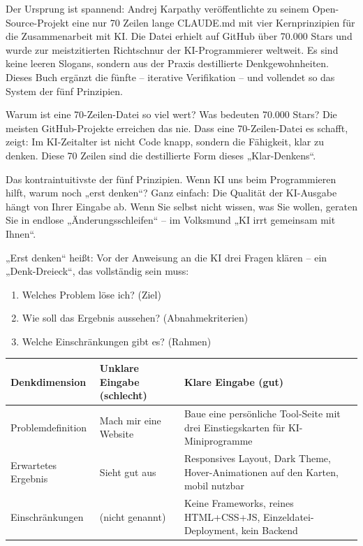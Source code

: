 

Der Ursprung ist spannend: Andrej Karpathy veröffentlichte zu seinem Open-Source-Projekt eine nur 70 Zeilen lange CLAUDE.md mit vier Kernprinzipien für die Zusammenarbeit mit KI. Die Datei erhielt auf GitHub über 70.000 Stars und wurde zur meistzitierten Richtschnur der KI-Programmierer weltweit. Es sind keine leeren Slogans, sondern aus der Praxis destillierte Denkgewohnheiten. Dieses Buch ergänzt die fünfte – iterative Verifikation – und vollendet so das System der fünf Prinzipien.

\begin{tcbinfo}{Warum ist eine 70-Zeilen-Datei so viel wert?}
Was bedeuten 70.000 Stars? Die meisten GitHub-Projekte erreichen das nie. Dass eine 70-Zeilen-Datei es schafft, zeigt: Im KI-Zeitalter ist nicht Code knapp, sondern die Fähigkeit, klar zu denken. Diese 70 Zeilen sind die destillierte Form dieses „Klar-Denkens“.

\end{tcbinfo}


Das kontraintuitivste der fünf Prinzipien. Wenn KI uns beim Programmieren hilft, warum noch „erst denken“? Ganz einfach: Die Qualität der KI-Ausgabe hängt von Ihrer Eingabe ab. Wenn Sie selbst nicht wissen, was Sie wollen, geraten Sie in endlose „Änderungsschleifen“ – im Volksmund „KI irrt gemeinsam mit Ihnen“.

„Erst denken“ heißt: Vor der Anweisung an die KI drei Fragen klären – ein „Denk-Dreieck“, das vollständig sein muss:

\begin{enumerate}
  \item Welches Problem löse ich? (Ziel)
  \item Wie soll das Ergebnis aussehen? (Abnahmekriterien)
  \item Welche Einschränkungen gibt es? (Rahmen)
\end{enumerate}

\begin{center}
\begin{tabularx}{\linewidth}{|X|X|X|}
\hline
\textbf{Denkdimension} & \textbf{Unklare Eingabe (schlecht)} & \textbf{Klare Eingabe (gut)} \tabularnewline
\hline
Problemdefinition & Mach mir eine Website & Baue eine persönliche Tool-Seite mit drei Einstiegskarten für KI-Miniprogramme \tabularnewline
Erwartetes Ergebnis & Sieht gut aus & Responsives Layout, Dark Theme, Hover-Animationen auf den Karten, mobil nutzbar \tabularnewline
Einschränkungen & (nicht genannt) & Keine Frameworks, reines HTML+CSS+JS, Einzeldatei-Deployment, kein Backend \tabularnewline
\hline
\end{tabularx}
\end{center}

